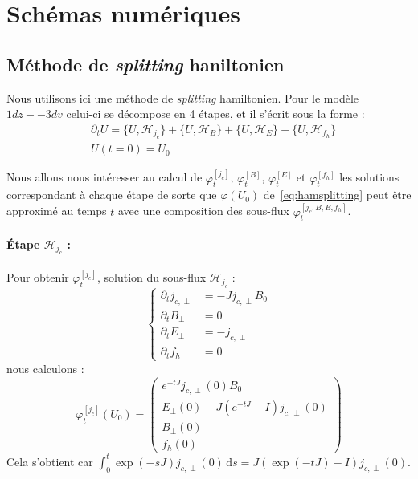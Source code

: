 
\section{Schémas numériques}

\subsection{Méthode de \emph{splitting} haniltonien}

Nous utilisons ici une méthode de \emph{splitting} hamiltonien. Pour le modèle $1dz -- 3dv$ celui-ci se décompose en 4 étapes, et il s'écrit sous la forme :
\begin{equation}
  \begin{aligned}
    & \partial_t U = \{ U,\mathcal{H}_{j_c}\} + \{ U,\mathcal{H}_B\} + \{ U,\mathcal{H}_E\} + \{ U,\mathcal{H}_{f_h}\} \\
    & U(t=0) = U_0
  \end{aligned}
  \label{eq:hamsplitting}
\end{equation}

Nous allons nous intéresser au calcul de $\varphi_t^{[j_c]}$, $\varphi_t^{[B]}$, $\varphi_t^{[E]}$ et $\varphi_t^{[f_h]}$ les solutions correspondant à chaque étape de sorte que $\varphi(U_0)$ de~\eqref{eq:hamsplitting} peut être approximé au temps $t$ avec une composition des sous-flux $\varphi_t^{[j_c,B,E,f_h]}$.

\paragraph{Étape $\mathcal{H}_{j_c}$ :\\}
Pour obtenir $\varphi_t^{[j_c]}$, solution du sous-flux $\mathcal{H}_{j_c}$ :
$$
  \begin{cases}
    \partial_t j_{c,\perp} &= -Jj_{c,\perp}B_0 \\
    \partial_t B_\perp     &= 0 \\
    \partial_t E_\perp     &= -j_{c,\perp} \\
    \partial_t f_h         &= 0
  \end{cases}
$$
nous calculons :
$$
  \varphi_t^{[j_c]}(U_0) = \begin{pmatrix}
    e^{-tJ}j_{c,\perp}(0)B_0 \\
    E_\perp(0) - J\left(e^{-tJ}-I\right)j_{c,\perp}(0) \\
    B_\perp(0) \\
    f_h(0)
  \end{pmatrix}
$$
Cela s'obtient car $\int_0^t \exp(-sJ)j_{c,\perp}(0)\,\mathrm{d}s = J\left(\exp(-tJ)-I\right)j_{c,\perp}(0)$.


